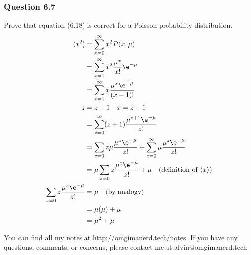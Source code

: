 \documentclass{math}
\begin{document}
\subsubsection*{Question 6.7}
Prove that equation (6.18) is correct for a Poisson probability distribution.
\begin{align*}
  \langle x^2\rangle &= \sum_{x=0}^{\infty}x^2P(x,\mu) \\
  &= \sum_{x=1}^{\infty}x^2\frac{\mu^x}{x!}\e^{-\mu} \\
  &= \sum_{x=1}^{\infty}x\frac{\mu^x\e^{-\mu}}{(x-1)!} \\
  z &= z-1 \quad x = z+1 \\
  &= \sum_{z=0}^{\infty}(z+1)\frac{\mu^{z+1}\e^{-\mu}}{z!} \\
  &= \sum_{z=0}z\mu\frac{\mu^z\e^{-\mu}}{z!}+
    \sum_{z=0}^{\infty}\mu\frac{\mu^z\e^{-\mu}}{z!} \\
  &= \mu\sum_{z=0}z\frac{\mu^z\e^{-\mu}}{z!}+\mu \quad
    (\text{definition of } \langle x\rangle)\\
  \sum_{z=0}z\frac{\mu^z\e^{-\mu}}{z!} &= \mu \quad (\text{by analogy}) \\
  &= \mu(\mu)+\mu \\
  &= \mu^2+\mu
\end{align*}

\begin{center}
  You can find all my notes at \url{http://omgimanerd.tech/notes}. If you have
  any questions, comments, or concerns, please contact me at
  alvin@omgimanerd.tech
\end{center}
\end{document}
